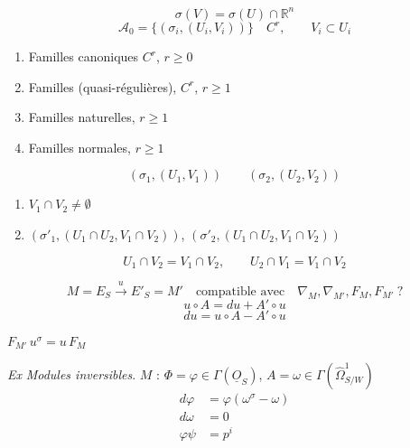 \documentclass[11pt,a4paper]{article}
\begin{document}
\[
\sigma(V) = \sigma(U) \cap \mathbb{R}^n
\]
\[
\mathcal{A}_0 = \bigl\lbrace (\sigma_i, (U_i, V_i)) \bigr\rbrace \quad C^r,
\qquad V_i \subset U_i
\]

\begin{enumerate}
\item Familles canoniques $C^r$, $r \geq 0$
\item Familles  (quasi-régulières), $C^r$, $r \geq 1$
\item Familles naturelles, $r \geq 1$
\item Familles normales, $r \geq 1$
\end{enumerate}

\[
(\sigma_1, (U_1, V_1)) \qquad (\sigma_2, (U_2, V_2))
\]
\begin{enumerate}
\item $V_1 \cap V_2 \neq \emptyset$
\item $(\sigma'_1, (U_1 \cap U_2, V_1 \cap V_2))$,\quad
$(\sigma'_2, (U_1 \cap U_2, V_1 \cap V_2))$
\end{enumerate}
\[
U_1 \cap V_2 = V_1 \cap V_2, \qquad U_2 \cap V_1 = V_1 \cap V_2
\]


\[
M = E_S \xrightarrow{\ u\ } E'_S = M' \quad \text{compatible avec}
\quad \nabla_M, \nabla_{M'}, F_M, F_{M'} \ ?
\]
\[
u \circ A = du + A' \circ u
\]
\[
\boxed{\ du = u \circ A - A' \circ u\ }
\]

\qquad
$\boxed{F_{M'}\, u^{\sigma} = u\, F_M}$

\emph{Ex} \quad \emph{Modules inversibles}. $M$ : \quad
$\Phi = \varphi \in \Gamma(\underline{O}_S)$, \quad
$A = \omega \in \Gamma(\hat{\Omega}^1_{S/W})$
\[
\boxed{\begin{aligned}
d\varphi &= \varphi(\omega^{\sigma} - \omega) \\
d\omega &= 0 \\
\varphi \psi &= p^{i}
\end{aligned}}
\]
\end{document}
